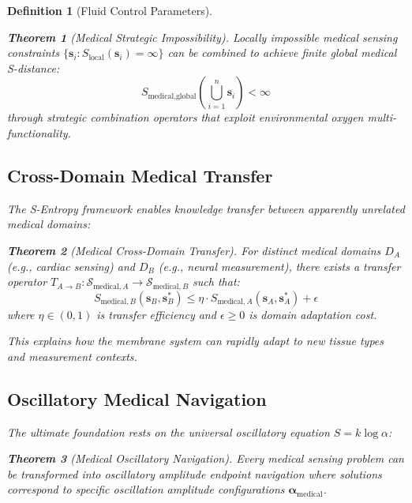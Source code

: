 \documentclass[12pt,a4paper]{article}
\newtheorem{theorem}{Theorem}
\newtheorem{definition}{Definition}
\begin{document}
\begin{definition}[Fluid Control Parameters]
\begin{theorem}[Medical Strategic Impossibility]
Locally impossible medical sensing constraints $\{\mathbf{s}_i : S_{\text{local}}(\mathbf{s}_i) = \infty\}$ can be combined to achieve finite global medical S-distance:
\begin{equation}
S_{\text{medical,global}}\left(\bigcup_{i=1}^n \mathbf{s}_i\right) < \infty
\end{equation}
through strategic combination operators that exploit environmental oxygen multi-functionality.
\end{theorem}

\subsection{Cross-Domain Medical Transfer}

The S-Entropy framework enables knowledge transfer between apparently unrelated medical domains:

\begin{theorem}[Medical Cross-Domain Transfer]
For distinct medical domains $D_A$ (e.g., cardiac sensing) and $D_B$ (e.g., neural measurement), there exists a transfer operator $T_{A \to B}: \mathcal{S}_{\text{medical},A} \to \mathcal{S}_{\text{medical},B}$ such that:
\begin{equation}
S_{\text{medical},B}(\mathbf{s}_B, \mathbf{s}_B^*) \leq \eta \cdot S_{\text{medical},A}(\mathbf{s}_A, \mathbf{s}_A^*) + \epsilon
\end{equation}
where $\eta \in (0, 1)$ is transfer efficiency and $\epsilon \geq 0$ is domain adaptation cost.
\end{theorem}

This explains how the membrane system can rapidly adapt to new tissue types and measurement contexts.

\subsection{Oscillatory Medical Navigation}

The ultimate foundation rests on the universal oscillatory equation $S = k \log \alpha$:

\begin{theorem}[Medical Oscillatory Navigation]
Every medical sensing problem can be transformed into oscillatory amplitude endpoint navigation where solutions correspond to specific oscillation amplitude configurations $\boldsymbol{\alpha}_{\text{medical}}$.
\end{theorem}


\end{definition}
\end{document}
